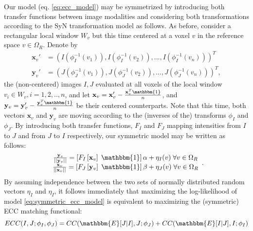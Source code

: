 Our model (eq. \eqref{eq:ecc_model}) may be symmetrized by introducing both transfer functions between image modalities and considering both transformations according to the SyN transformation model as follows. As before, consider a rectangular local window $W_{v}$ but this time centered at a voxel $v$ in the reference space $v\in\Omega_{R}$. Denote by
\begin{align*}
    \mathbf{x}_{v}' &= \left(I(\phi_{I}^{-1}(v_{1})), I(\phi_{I}^{-1}(v_{2})), ..., I(\phi_{I}^{-1}(v_{n}))\right)^{T}\\
    \mathbf{y}_{v}' &= \left(J(\phi_{J}^{-1}(v_{1})), J(\phi_{J}^{-1}(v_{2})), ..., J(\phi_{J}^{-1}(v_{n}))\right)^{T},
\end{align*}
the (non-centered) images $I, J$ evaluated at all voxels of the local window $v_{i}\in W_{v}, i=1, 2, .., n$, and let $\mathbf{x}_{v} = \mathbf{x}_{v}' - \frac{\mathbf{x}_{v}^{T}\mathbbm{1}}{n}$, and $\mathbf{y}_{v} = \mathbf{y}_{v}' - \frac{\mathbf{y}_{v}^{T}\mathbbm{1}}{n}$ be their centered counterparts. Note that this time, both vectors $\mathbf{x}_{v}$ and $\mathbf{y}_{v}$ are moving according to the (inverses of the) transforms $\phi_{I}$ and $\phi_{J}$. By introducing both transfer functions, $F_{I}$ and $F_{J}$ mapping intensities from $I$ to $J$ and from $J$ to $I$ respectively, our symmetric model may be written as follows:
\begin{equation}\label{eq:symmetric_ecc_model}
    \begin{array}{ccccc}
        \frac{\mathbf{y}_{v}}{||\mathbf{y}_{v}||} = \left[F_{I}\left[\mathbf{x}_{v}\right] \; \mathbbm{1}\right]\alpha + \eta_{I}(v) \; \forall v\in\Omega_{R}\\
        \frac{\mathbf{x}_{v}}{||\mathbf{x}_{v}||} = \left[F_{J}\left[\mathbf{y}_{v}\right] \; \mathbbm{1}\right]\beta + \eta_{J}(v) \; \forall v\in\Omega_{R}\\
    \end{array}.
\end{equation}
By assuming independence between the two sets of normally distributed random vectors $\eta_{I}$ and $\eta_{I}$, it follows immediately that maximizing the log-likelihood of model \eqref{eq:symmetric_ecc_model} is equivalent to maximizing the (symmetric) ECC matching functional:
\begin{equation*}
    ECC(I, J;\phi_{I}, \phi_{J}) = CC(\mathbbm{E}[J|I], J ; \phi_{J}) + CC(\mathbbm{E}[I|J], I ; \phi_{I})
\end{equation*}
